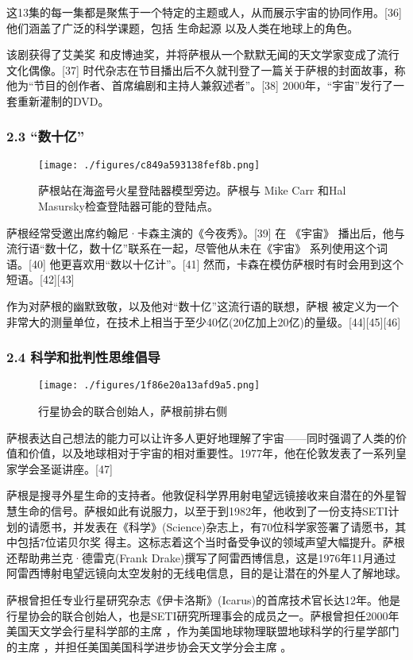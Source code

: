 这13集的每一集都是聚焦于一个特定的主题或人，从而展示宇宙的协同作用。[36] 他们涵盖了广泛的科学课题，包括 生命起源 以及人类在地球上的角色。

该剧获得了艾美奖 和皮博迪奖，并将萨根从一个默默无闻的天文学家变成了流行文化偶像。[37] 时代杂志在节目播出后不久就刊登了一篇关于萨根的封面故事，称他为“节目的创作者、首席编剧和主持人兼叙述者”。[38] 2000年，“宇宙”发行了一套重新灌制的DVD。
\subsubsection{2.3 “数十亿”}
\begin{figure}[ht]
\centering
\texttt{[image: ./figures/c849a593138fef8b.png]}
\caption{萨根站在海盗号火星登陆器模型旁边。萨根与 Mike Carr 和Hal Masursky检查登陆器可能的登陆点。} \label{fig_Sagan_4}
\end{figure}
萨根经常受邀出席约翰尼·卡森主演的《今夜秀》。[39] 在 《宇宙》 播出后，他与流行语“数十亿，数十亿”联系在一起，尽管他从未在《宇宙》 系列使用这个词语。[40] 他更喜欢用“数以十亿计”。[41] 然而，卡森在模仿萨根时有时会用到这个短语。[42][43]

作为对萨根的幽默致敬，以及他对“数十亿”这流行语的联想，萨根 被定义为一个非常大的测量单位，在技术上相当于至少40亿(20亿加上20亿)的量级。[44][45][46]
\subsubsection{2.4 科学和批判性思维倡导}
\begin{figure}[ht]
\centering
\texttt{[image: ./figures/1f86e20a13afd9a5.png]}
\caption{行星协会的联合创始人，萨根前排右侧} \label{fig_Sagan_5}
\end{figure}
萨根表达自己想法的能力可以让许多人更好地理解了宇宙——同时强调了人类的价值和价值，以及地球相对于宇宙的相对重要性。1977年，他在伦敦发表了一系列皇家学会圣诞讲座。[47]

萨根是搜寻外星生命的支持者。他敦促科学界用射电望远镜接收来自潜在的外星智慧生命的信号。萨根如此有说服力，以至于到1982年，他收到了一份支持SETI计划的请愿书，并发表在《科学》(Science)杂志上，有70位科学家签署了请愿书，其中包括7位诺贝尔奖 得主。这标志着这个当时备受争议的领域声望大幅提升。萨根还帮助弗兰克·德雷克(Frank Drake)撰写了阿雷西博信息，这是1976年11月通过阿雷西博射电望远镜向太空发射的无线电信息，目的是让潜在的外星人了解地球。

萨根曾担任专业行星研究杂志《伊卡洛斯》(Icarus)的首席技术官长达12年。他是行星协会的联合创始人，也是SETI研究所理事会的成员之一。萨根曾担任2000年美国天文学会行星科学部的主席 ，作为美国地球物理联盟地球科学的行星学部门的主席 ，并担任美国美国科学进步协会天文学分会主席 。

